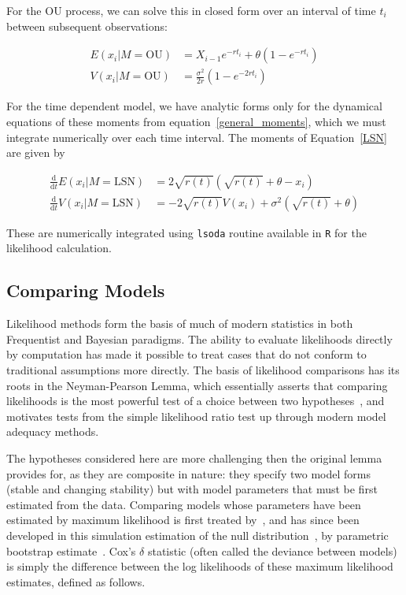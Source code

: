 \documentclass[authoryear,review,11pt]{elsarticle}
\newcommand{\ud}{\mathrm{d}}
\begin{document}
For the OU process, we can solve this in closed form over an interval of time $t_i$ between subsequent observations:

\begin{align}
  E(x_i| M = \text{OU}) &= X_{i-1} e^{-r t_i} + \theta \left(1 - e^{-rt_i} \right) \\
V(x_i| M = \text{OU}) &= \frac{\sigma^2}{2 r} \left(1 - e^{-2 r t_i} \right)
\label{OUsoln}
\end{align}

For the time dependent model, we have analytic forms only for the dynamical equations of these moments from equation~\eqref{general_moments}, which we must integrate numerically over each time interval.
The moments of Equation~\eqref{LSN} are given by

\begin{align}
\frac{\ud }{\ud t} E(x_i| M = \text{LSN})&=  2\sqrt{r(t)}(\sqrt{r(t)}+\theta - x_i) \\
\frac{\ud}{\ud t} V(x_i| M = \text{LSN}) &=  -2 \sqrt{r(t)} V(x_i) + \sigma^2 ( \sqrt{r(t)}+\theta )
\label{LSNsoln}
\end{align}

These are numerically integrated using \texttt{lsoda} routine available in \texttt{R} for the likelihood calculation.

\subsection*{Comparing Models}
Likelihood methods form the basis of much of modern statistics
in both Frequentist and Bayesian paradigms.
The ability to evaluate likelihoods directly by computation has made it
possible to treat cases that do not conform to traditional assumptions more directly.
The basis of likelihood comparisons has its roots in the Neyman-Pearson Lemma,
which essentially asserts that comparing likelihoods is the most powerful test
of a choice between two hypotheses~\citep{Neyman1933}, and motivates
tests from the simple likelihood ratio test up through modern model adequacy methods.

The hypotheses considered here are more challenging then the original lemma provides for,
as they are composite in nature:
they specify two model forms (stable and changing stability)
but with model parameters that must be first estimated from the data.
Comparing models whose parameters have been estimated by maximum likelihood is first treated by~\citet{Cox1961, Cox1962},
and has since been developed in this simulation estimation of the null distribution~\citep{McLachlan1987}, by parametric bootstrap estimate~\citep{Efron1987}.
Cox's $\delta$ statistic (often called the deviance between models)
is simply the difference between the log likelihoods of these maximum likelihood estimates, defined as follows.
\end{document}

